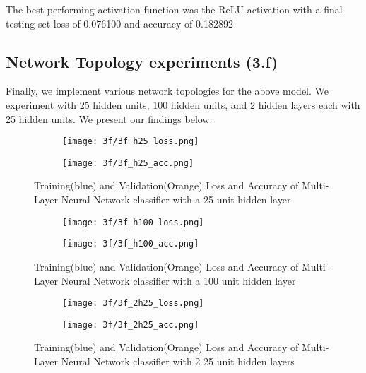 \documentclass{article} %
\begin{document}
The best performing activation function was the ReLU activation with a final testing set loss of 0.076100 and accuracy of 0.182892

\subsection{Network Topology experiments (3.f)}

Finally, we implement various network topologies for the above model. We experiment with 25 hidden units, 100 hidden units, and 2 hidden layers each with 25 hidden units. We present our findings below. 

\begin{figure}[H]
\centering
\begin{subfigure}{.5\textwidth}
  \centering
  \texttt{[image: 3f/3f\_h25\_loss.png]}  \label{fig:sub1}
\end{subfigure}%
\begin{subfigure}{.5\textwidth}
  \centering
\texttt{[image: 3f/3f\_h25\_acc.png]}
  \label{fig:sub2}
\end{subfigure}
\caption{Training(blue) and Validation(Orange) Loss and Accuracy of Multi-Layer Neural Network classifier with a 25 unit hidden layer}
\label{fig:test}
\end{figure}

\begin{figure}[H]
\centering
\begin{subfigure}{.5\textwidth}
  \centering
  \texttt{[image: 3f/3f\_h100\_loss.png]}  \label{fig:sub1}
\end{subfigure}%
\begin{subfigure}{.5\textwidth}
  \centering
\texttt{[image: 3f/3f\_h100\_acc.png]}
  \label{fig:sub2}
\end{subfigure}
\caption{Training(blue) and Validation(Orange) Loss and Accuracy of Multi-Layer Neural Network classifier with a 100 unit hidden layer}
\label{fig:test}
\end{figure}

\begin{figure}[H]
\centering
\begin{subfigure}{.5\textwidth}
  \centering
  \texttt{[image: 3f/3f\_2h25\_loss.png]}  \label{fig:sub1}
\end{subfigure}%
\begin{subfigure}{.5\textwidth}
  \centering
\texttt{[image: 3f/3f\_2h25\_acc.png]}
  \label{fig:sub2}
\end{subfigure}
\caption{Training(blue) and Validation(Orange) Loss and Accuracy of Multi-Layer Neural Network classifier with 2 25 unit hidden layers}
\label{fig:test}
\end{figure}
\end{document}
